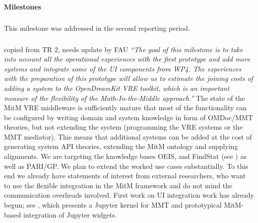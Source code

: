 \paragraph{Milestones}

\subparagraph{}
This milestone was addressed in the second reporting period.
\medskip
%

\subparagraph{}
\begin{oldpart}{copied from TR 2, needs update by FAU}
\emph{“The goal of this milestone is to take into account all the operational experiences with the first prototype and add more systems and integrate some of the UI components from WP4.
  The experiences with the preparation of this prototype will allow us to estimate the joining costs of adding a system to the OpenDreamKit VRE toolkit, which is an important measure of the flexibility of the Math-In-the-Middle approach.”}
The state of the MitM VRE middleware is sufficiently mature that most of the functionality can be configured by writing domain and system knowledge in form of OMDoc/MMT theories, but not extending the system (programming the VRE systems or the MMT mediator).
This means that additional systems can be added at the cost of generating system API theories, extending the  MitM ontology and supplying alignments.
We are targeting the knowledge bases OEIS, and FindStat (see ) as well as PARI/GP.
We plan to extend the worked use cases substantially.
To this end we already have statements of interest from external researchers, who want to use the flexible integration in the MitM framework and do not mind the communication overheads involved. 
First work on UI integration work has already begun; see  , which presents a Jupyter kernel for MMT and prototypical MitM-based integration of Jupyter widgets.
\end{oldpart}


